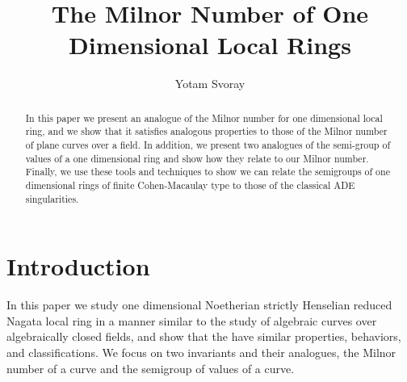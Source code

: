 \documentclass{article}
\title{The Milnor Number of One Dimensional Local Rings}
\author{Yotam Svoray}
\date{}
\numberwithin{theorem}{section}
\begin{document}
\maketitle

\begin{abstract}
    In this paper we present an analogue of the Milnor number for one dimensional local ring, and we show that it satisfies analogous properties to those of the Milnor number of plane curves over a field. In addition, we present two analogues of the semi-group of values of a one dimensional ring and show how they relate to our Milnor number. Finally, we use these tools and techniques to show we can relate the semigroups of one dimensional rings of finite Cohen-Macaulay type to those of the classical ADE singularities. 
\end{abstract}

  \tableofcontents


\section{Introduction}\label{sec:Intro3}

In this paper we study one dimensional Noetherian strictly Henselian reduced Nagata local ring in a manner similar to the study of algebraic curves over algebraically closed fields, and show that the have similar properties, behaviors, and classifications. We focus on two invariants and their analogues, the Milnor number of a curve and the semigroup of values of a curve.\\
\end{document}
